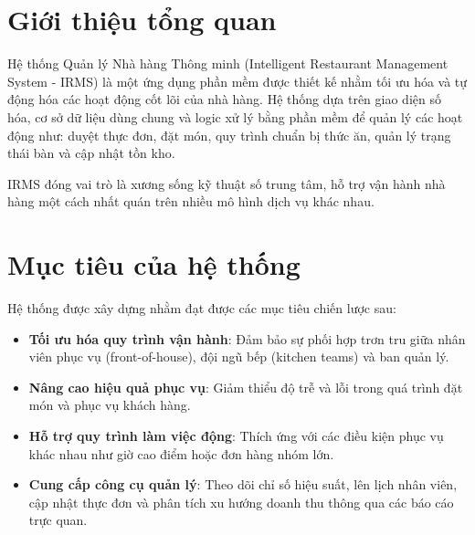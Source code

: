 \section{Giới thiệu tổng quan}
Hệ thống Quản lý Nhà hàng Thông minh (Intelligent Restaurant Management System - IRMS) là một ứng dụng phần mềm được thiết kế nhằm tối ưu hóa và tự động hóa các hoạt động cốt lõi của nhà hàng. Hệ thống dựa trên giao diện số hóa, cơ sở dữ liệu dùng chung và logic xử lý bằng phần mềm để quản lý các hoạt động như: duyệt thực đơn, đặt món, quy trình chuẩn bị thức ăn, quản lý trạng thái bàn và cập nhật tồn kho.

IRMS đóng vai trò là xương sống kỹ thuật số trung tâm, hỗ trợ vận hành nhà hàng một cách nhất quán trên nhiều mô hình dịch vụ khác nhau.

\section{Mục tiêu của hệ thống}
Hệ thống được xây dựng nhằm đạt được các mục tiêu chiến lược sau:
\begin{itemize}
    \item \textbf{Tối ưu hóa quy trình vận hành}: Đảm bảo sự phối hợp trơn tru giữa nhân viên phục vụ (front-of-house), đội ngũ bếp (kitchen teams) và ban quản lý.
    \item \textbf{Nâng cao hiệu quả phục vụ}: Giảm thiểu độ trễ và lỗi trong quá trình đặt món và phục vụ khách hàng.
    \item \textbf{Hỗ trợ quy trình làm việc động}: Thích ứng với các điều kiện phục vụ khác nhau như giờ cao điểm hoặc đơn hàng nhóm lớn.
    \item \textbf{Cung cấp công cụ quản lý}: Theo dõi chỉ số hiệu suất, lên lịch nhân viên, cập nhật thực đơn và phân tích xu hướng doanh thu thông qua các báo cáo trực quan.
\end{itemize}

